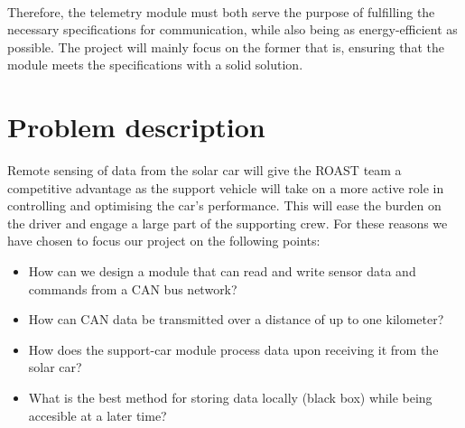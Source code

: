 \documentclass[]{article}
\begin{document}
\\
Therefore, the telemetry module must both serve the purpose of fulfilling the necessary specifications for communication, while also being as energy-efficient as possible. The project will mainly focus on the former that is, ensuring that the module meets the specifications with a solid solution.

\section{Problem description}
Remote sensing of data from the solar car will give the ROAST team a competitive advantage as the support vehicle will take on a more active role in controlling and optimising the car's performance. This will ease the burden on the driver and engage a large part of the supporting crew. For these reasons we have chosen to focus our project on the following points:   
\begin{itemize}
    \item How can we design a module that can read and write sensor data and commands from a CAN bus network? 
    \item How can CAN data be transmitted over a distance of up to one kilometer? 
    \item How does the support-car module process data upon receiving it from the solar car?
    \item What is the best method for storing data locally (black box) while being accesible at a later time? 
\end{itemize}
\end{document}
